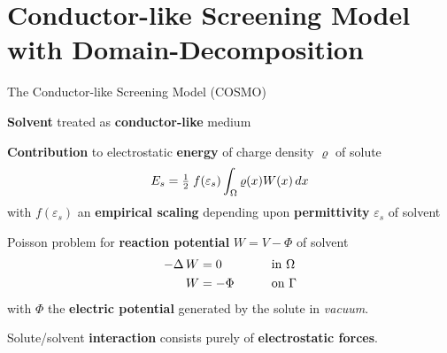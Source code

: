 \section{\bf Conductor-like Screening Model with Domain-Decomposition}
\begin{frame}{The Conductor-like Screening Model (COSMO)}

%


\begin{wideitemize}
\item {\bf Solvent} treated as {\bf conductor-like} medium
\item {\bf Contribution} to electrostatic  {\bf energy} of charge density $\varrho$ of solute
\begin{align*}
E_s =\tfrac{1}{2} \;  f(\varepsilon_s)  \int_{\Omega}\varrho(x) W(x)\, dx \displaybump
\end{align*}
with $f(\varepsilon_s)$ an {\bf empirical scaling} depending upon {\bf permittivity} $\varepsilon_s$ of solvent
\medskip
\item Poisson problem for {\bf reaction potential} $W = V - \Phi$ of solvent
\begin{alignat*}{3}
-\Delta \, W &= 0 &&\text{in } \Omega \displaybump \\
W &=-\Phi \qquad &&\text{on }\Gamma
\end{alignat*}
with $\Phi$ the {\bf electric potential} generated by the solute in \emph{vacuum}.
\item Solute/solvent {\bf interaction} consists purely of {\bf electrostatic forces}.
\end{wideitemize}

\end{frame}


